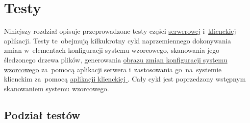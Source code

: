 \documentclass[thesis]{subfiles}
\begin{document}
\chapter{Testy}

Niniejszy rozdział opisuje przeprowadzone testy części \hyperref[sec:srv-app]{serwerowej} i~\hyperref[sec:cli-app]{klienckiej} aplikacji. Testy te~obejmują kilkukrotny cykl naprzemiennego dokonywania zmian w~elementach konfiguracji systemu wzorcowego, skanowania jego śledzonego drzewa plików, generowania \hyperref[sec:obraz-zmian-konfiguracji]{obrazu zmian konfiguracji systemu wzorcowego} za~pomocą aplikacji serwera \hyperref[sec:srv-app]{\texttt{\srvappname{}}} i~zastosowania go~na~systemie klienckim za~pomocą \hyperref[sec:cli-app]{aplikacji klienckiej \texttt{\cliappname{}}}. Cały cykl jest poprzedzony wstępnym skanowaniem systemu wzorcowego.


\section{Podział testów}
\end{document}
